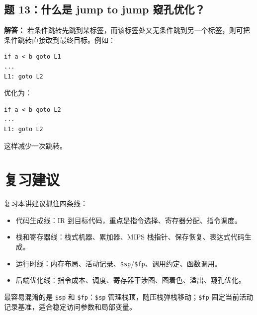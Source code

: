 \documentclass[UTF8,fontset=none,11pt]{ctexart}
\begin{document}
\subsection*{题 13：什么是 jump to jump 窥孔优化？}

\textbf{解答：} 若条件跳转先跳到某标签，而该标签处又无条件跳到另一个标签，则可把条件跳转直接改到最终目标。例如：

\begin{verbatim}
if a < b goto L1
...
L1: goto L2
\end{verbatim}

优化为：

\begin{verbatim}
if a < b goto L2
...
L1: goto L2
\end{verbatim}

这样减少一次跳转。

\section*{复习建议}

复习本讲建议抓住四条线：

\begin{itemize}
  \item 代码生成线：IR 到目标代码，重点是指令选择、寄存器分配、指令调度。
  \item 栈和寄存器线：栈式机器、累加器、MIPS 栈指针、保存恢复、表达式代码生成。
  \item 运行时线：内存布局、活动记录、\texttt{\$sp}/\texttt{\$fp}、调用约定、函数调用。
  \item 后端优化线：指令成本、调度、寄存器干涉图、图着色、溢出、窥孔优化。
\end{itemize}

最容易混淆的是 \texttt{\$sp} 和 \texttt{\$fp}：\texttt{\$sp} 管理栈顶，随压栈弹栈移动；\texttt{\$fp} 固定当前活动记录基准，适合稳定访问参数和局部变量。
\end{document}
